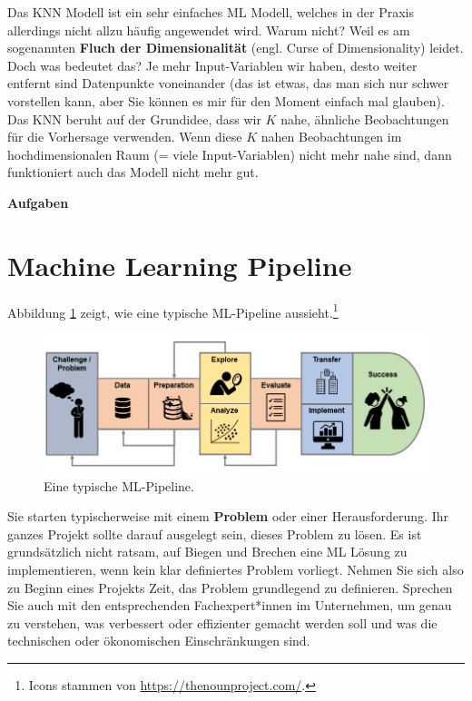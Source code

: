 \documentclass[
]{book}
\begin{document}
Das KNN Modell ist ein sehr einfaches ML Modell, welches in der Praxis allerdings nicht allzu häufig angewendet wird. Warum nicht? Weil es am sogenannten \textbf{Fluch der Dimensionalität} (engl. Curse of Dimensionality) leidet. Doch was bedeutet das? Je mehr Input-Variablen wir haben, desto weiter entfernt sind Datenpunkte voneinander (das ist etwas, das man sich nur schwer vorstellen kann, aber Sie können es mir für den Moment einfach mal glauben). Das KNN beruht auf der Grundidee, dass wir \(K\) nahe, ähnliche Beobachtungen für die Vorhersage verwenden. Wenn diese \(K\) nahen Beobachtungen im hochdimensionalen Raum (= viele Input-Variablen) nicht mehr nahe sind, dann funktioniert auch das Modell nicht mehr gut.

\textbf{Aufgaben}

\hypertarget{machine-learning-pipeline}{%
\section{Machine Learning Pipeline}\label{machine-learning-pipeline}}

Abbildung \ref{fig:pipeline} zeigt, wie eine typische ML-Pipeline aussieht.\footnote{Icons stammen von \url{https://thenounproject.com/}.}

\begin{figure}

{\centering \includegraphics[width=0.9\linewidth]{images/Pipeline} 

}

\caption{Eine typische ML-Pipeline. }\label{fig:pipeline}
\end{figure}

Sie starten typischerweise mit einem \textbf{Problem} oder einer Herausforderung. Ihr ganzes Projekt sollte darauf ausgelegt sein, dieses Problem zu lösen. Es ist grundsätzlich nicht ratsam, auf Biegen und Brechen eine ML Lösung zu implementieren, wenn kein klar definiertes Problem vorliegt. Nehmen Sie sich also zu Beginn eines Projekts Zeit, das Problem grundlegend zu definieren. Sprechen Sie auch mit den entsprechenden Fachexpert*innen im Unternehmen, um genau zu verstehen, was verbessert oder effizienter gemacht werden soll und was die technischen oder ökonomischen Einschränkungen sind.
\end{document}
